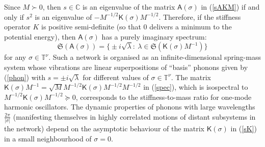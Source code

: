 \documentclass[letterpaper, 10pt, conference]{ieeeconf}  %
\def\mC{\mathbb{C}}    %
\def\fS{\mathfrak{S}}
\def\sK{\mathsf{K}}
\def\sA{\mathsf{A}}
\def\mT{\mathbb{T}}
\begin{document}
Since $M\succ 0$, then $s\in \mC$ is an eigenvalue of the matrix $\sA(\sigma)$ in (\ref{sAKM}) if and only if $s^2$ is an eigenvalue of $-M^{-1/2}\sK(\sigma)M^{-1/2}$. Therefore, if the stiffness operator $K$ is positive semi-definite (so that $0$ delivers a minimum to the potential energy), then $\sA(\sigma)$ has a purely imaginary spectrum:
\begin{equation}
\label{spec}
    \fS(\sA(\sigma))
    =
    \big\{
        \pm i\sqrt{\lambda}:\
        \lambda \in \fS(\sK(\sigma)M^{-1})
    \big\}
\end{equation}
for any $\sigma \in \mT^\nu$. Such a network is organised as an infinite-dimensional spring-mass system whose vibrations are linear superpositions of ``basis'' phonons given by (\ref{phon}) with $s=\pm i \sqrt{\lambda}$ for different values of $\sigma \in \mT^\nu$. The matrix $\sK(\sigma)M^{-1} = \sqrt{M}M^{-1/2}\sK(\sigma)M^{-1/2}M^{-1/2}$ in (\ref{spec}),  which is isospectral to $M^{-1/2}\sK(\sigma)M^{-1/2}\succcurlyeq 0$, corresponds to the stiffness-to-mass ratio for one-mode harmonic oscillators. The dynamic properties of phonons with large wavelengths $\frac{2\pi}{|\sigma|}$ (manifesting themselves in highly correlated motions of distant subsystems in the network) depend on the asymptotic behaviour of the matrix $\sK(\sigma)$ in (\ref{sK}) in a small neighbourhood of $\sigma = 0$.

\end{document}
